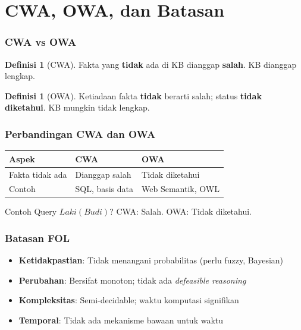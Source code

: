 \documentclass[handout]{beamer}
\theoremstyle{definition}
\newtheorem{definisi}[theorem]{Definisi}
\theoremstyle{example}
\begin{document}
\section{CWA, OWA, dan Batasan}

\begin{frame}
\frametitle{CWA vs OWA}
\begin{definisi}[CWA]
Fakta yang \textbf{tidak} ada di KB dianggap \textbf{salah}. KB dianggap lengkap.
\end{definisi}
\begin{definisi}[OWA]
Ketiadaan fakta \textbf{tidak} berarti salah; status \textbf{tidak diketahui}. KB mungkin tidak lengkap.
\end{definisi}
\end{frame}

\begin{frame}
\frametitle{Perbandingan CWA dan OWA}
\begin{center}
\small
\begin{tabular}{|l|l|l|}
\hline
\textbf{Aspek} & \textbf{CWA} & \textbf{OWA} \\ \hline
Fakta tidak ada & Dianggap salah & Tidak diketahui \\ \hline
Contoh & SQL, basis data & Web Semantik, OWL \\ \hline
\end{tabular}
\end{center}
\begin{block}{Contoh}
Query $Laki(Budi)$? CWA: Salah. OWA: Tidak diketahui.
\end{block}
\end{frame}

\begin{frame}
\frametitle{Batasan FOL}
\begin{itemize}
  \item \textbf{Ketidakpastian}: Tidak menangani probabilitas (perlu fuzzy, Bayesian)
  \item \textbf{Perubahan}: Bersifat monoton; tidak ada \textit{defeasible reasoning}
  \item \textbf{Kompleksitas}: Semi-decidable; waktu komputasi signifikan
  \item \textbf{Temporal}: Tidak ada mekanisme bawaan untuk waktu
\end{itemize}
\end{frame}
\end{document}
